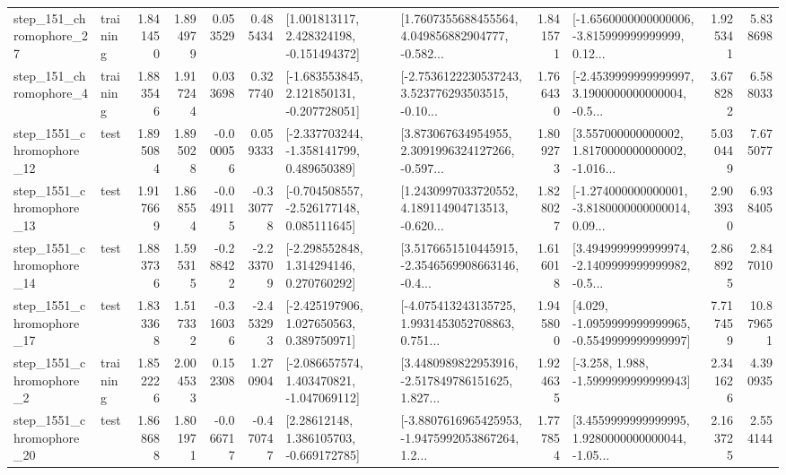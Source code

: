 \begin{tabular}{llrrrrllrlrr}
  step\_151\_chromophore\_27 &  training &      1.841450 &    1.894979 &      0.053529 &  0.485434 &    [1.001813117, 2.428324198, -0.151494372] &  [1.7607355688455564, 4.049856882904777, -0.582... &       1.841571 &  [-1.6560000000000006, -3.815999999999999, 0.12... &            1.925341 &          5.838698 \\
   step\_151\_chromophore\_4 &  training &      1.883546 &    1.917244 &      0.033698 &  0.327740 &   [-1.683553845, 2.121850131, -0.207728051] &  [-2.7536122230537243, 3.523776293503515, -0.10... &       1.766430 &  [-2.4539999999999997, 3.1900000000000004, -0.5... &            3.678282 &          6.588033 \\
 step\_1551\_chromophore\_12 &      test &      1.895084 &    1.895028 &     -0.000056 &  0.059333 &   [-2.337703244, -1.358141799, 0.489650389] &  [3.873067634954955, 2.3091996324127266, -0.597... &       1.809273 &  [3.557000000000002, 1.8170000000000002, -1.016... &            5.030449 &          7.675077 \\
 step\_1551\_chromophore\_13 &      test &      1.917669 &    1.868554 &     -0.049115 & -0.330778 &   [-0.704508557, -2.526177148, 0.085111645] &  [1.2430997033720552, 4.189114904713513, -0.620... &       1.828027 &  [-1.274000000000001, -3.8180000000000014, 0.09... &            2.903930 &          6.938405 \\
 step\_1551\_chromophore\_14 &      test &      1.883736 &    1.595315 &     -0.288422 & -2.233709 &    [-2.298552848, 1.314294146, 0.270760292] &  [3.5176651510445915, -2.3546569908663146, -0.4... &       1.616018 &  [3.4949999999999974, -2.1409999999999982, -0.5... &            2.868925 &          2.847010 \\
 step\_1551\_chromophore\_17 &      test &      1.833368 &    1.517332 &     -0.316036 & -2.453293 &    [-2.425197906, 1.027650563, 0.389750971] &  [-4.075413243135725, 1.9931453052708863, 0.751... &       1.945800 &  [4.029, -1.0959999999999965, -0.5549999999999997] &            7.717459 &         10.879651 \\
  step\_1551\_chromophore\_2 &  training &      1.852226 &    2.004533 &      0.152308 &  1.270904 &   [-2.086657574, 1.403470821, -1.047069112] &  [3.4480989822953916, -2.517849786151625, 1.827... &       1.924635 &               [-3.258, 1.988, -1.5999999999999943] &            2.341626 &          4.390935 \\
 step\_1551\_chromophore\_20 &      test &      1.868688 &    1.801971 &     -0.066717 & -0.470747 &     [2.28612148, 1.386105703, -0.669172785] &  [-3.8807616965425953, -1.9475992053867264, 1.2... &       1.777854 &  [3.4559999999999995, 1.9280000000000044, -1.05... &            2.163725 &          2.554144 \\

\end{tabular}
